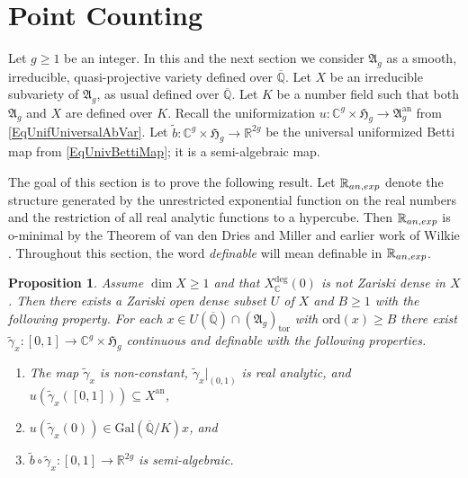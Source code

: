 \documentclass[12pt,oneside]{amsart}
\newcounter{maincounter}
\numberwithin{maincounter}{section}
\numberwithin{equation}{section}
\newtheorem{proposition}[maincounter]{Proposition}
\def\RR{\mathbb{R}}
\def\CC{\mathbb{C}}
\def\QQ{\mathbb{Q}}
\newcommand{\IC}{{\CC}}
\newcommand{\IR}{{\RR}}
\newcommand{\IRanexp}{{{\RR}_{\rm an,exp}}}
\newcommand{\IQbar}{{\overline{\QQ}}}
\renewcommand{\subset}{\subseteq} %
\begin{document}
\section{Point Counting}
Let $g\ge 1$ be an integer. In this and the next section we consider
$\mathfrak{A}_g$ as a smooth, irreducible, quasi-projective variety
defined over $\IQbar$.
Let $X$ be an irreducible subvariety of $\mathfrak{A}_g$, as usual defined over
$\IQbar$. Let $K$ be a number field such that both $\mathfrak{A}_g$ and $X$
are defined over $K$. Recall the uniformization $u \colon \IC^g \times \mathfrak{H}_g
\rightarrow \mathfrak{A}_g^{\mathrm{an}}$ from
\eqref{EqUnifUniversalAbVar}.
Let $\tilde{b} \colon \IC^g \times \mathfrak{H}_g \rightarrow \IR^{2g}$ be the universal uniformized Betti map from \eqref{EqUnivBettiMap}; it is a semi-algebraic map.%

The goal of this section is to prove the following result. Let $\IRanexp$ denote the  structure generated by the unrestricted
exponential function on the real numbers and the restriction of all
real analytic functions to a hypercube. Then $\IRanexp$ is o-minimal by the
Theorem of van den Dries and Miller \cite{DriesMiller:94} and earlier work of Wilkie \cite{Wilkie:96}.
Throughout this section, the word \textit{definable} will mean definable in $\IRanexp$. 


\begin{proposition}\label{PropositionSemiAlgCounting}
  Assume $\dim X\ge 1$ and
  that $X_\IC^{\mathrm{deg}}(0)$ is not Zariski dense in $X$. Then there exists a Zariski open
  dense subset $U$ of $X$ and $B\ge 1$ with the following property. For each $x \in
  U(\IQbar) \cap (\mathfrak{A}_g)_{\mathrm{tor}}$ with
  $\mathrm{ord}(x)\ge B$
  there exist $\tilde\gamma_x \colon
  [0,1]\rightarrow\IC^g\times \mathfrak{H}_g$ continuous and definable with
  the following properties. %
  \begin{enumerate}
  \item[(i)] The map $\tilde\gamma_x$ is non-constant,
    $\tilde\gamma_x|_{(0,1)}$ is real analytic,  and $u(\tilde\gamma_x([0,1]))\subset
    X^{\mathrm{an}}$, 
  \item[(ii)] $u(\tilde\gamma_x(0)) \in \mathrm{Gal}(\IQbar/K)x$, and
  \item[(iii)] $\tilde{b} \circ \tilde{\gamma}_x\colon
    [0,1]\rightarrow\IR^{2g}$ is semi-algebraic. %
  \end{enumerate}
\end{proposition}
\end{document}
